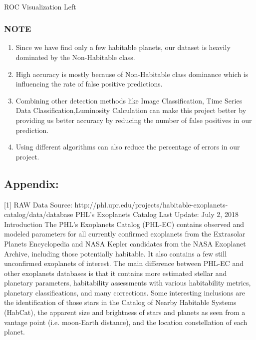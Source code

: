 \documentclass[11pt]{article}
\providecommand{\tightlist}{%
      \setlength{\itemsep}{0pt}\setlength{\parskip}{0pt}}
\begin{document}
    \begin{center}
    \end{center}
    { \hspace*{\fill} \\}
    ROC Visualization Left
    \subsubsection{NOTE}\label{note}

    \begin{enumerate}
\def\labelenumi{\arabic{enumi}.}
\tightlist
\item
  Since we have find only a few habitable planets, our dataset is
  heavily dominated by the Non-Habitable class.
\item
  High accuracy is mostly because of Non-Habitable class dominance which
  is influencing the rate of false positive predictions.
\item
  Combining other detection methods like Image Classification, Time
  Series Data Classification,Luminosity Calculation can make this
  project better by providing us better accuracy by reducing the number
  of false positives in our prediction.
\item
  Using different algorithms can also reduce the percentage of errors in
  our project.
\end{enumerate}

    \subsection{Appendix:}\label{appendix}

{[}1{]} RAW Data Source:
http://phl.upr.edu/projects/habitable-exoplanets-catalog/data/database
PHL's Exoplanets Catalog Last Update: July 2, 2018 Introduction The
PHL's Exoplanets Catalog (PHL-EC) contains observed and modeled
parameters for all currently confirmed exoplanets from the Extrasolar
Planets Encyclopedia and NASA Kepler candidates from the NASA Exoplanet
Archive, including those potentially habitable. It also contains a few
still unconfirmed exoplanets of interest. The main difference between
PHL-EC and other exoplanets databases is that it contains more estimated
stellar and planetary parameters, habitability assessments with various
habitability metrics, planetary classifications, and many corrections.
Some interesting inclusions are the identification of those stars in the
Catalog of Nearby Habitable Systems (HabCat), the apparent size and
brightness of stars and planets as seen from a vantage point (i.e.
moon-Earth distance), and the location constellation of each planet.
\end{document}
